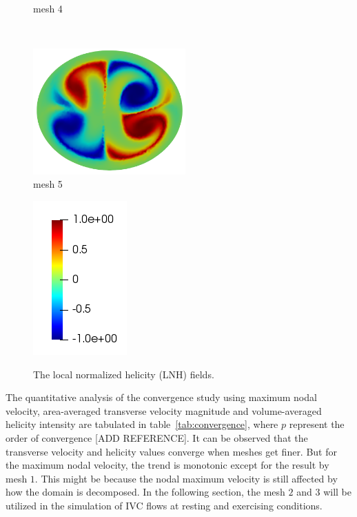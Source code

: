 \begin{figure}[htbp]
\begin{minipage}[c][2in][c]{0.4\linewidth}
        mesh 4
    \end{minipage}\\[.5\baselineskip]
    \begin{minipage}[c][2in][c]{0.4\linewidth}
        \centering
        \includegraphics[width=2.3in]{imgs/vena_cava/LNH_mesh5.png}\\
        mesh 5
    \end{minipage}
    \begin{minipage}[c][2in][c]{0.4\linewidth}
        \centering
        \includegraphics[width=.7in]{imgs/vena_cava/colormap_LNH.png}\\
    \end{minipage}
    \caption{The local normalized helicity (LNH) fields.}
    \label{fig:lnh}
\end{figure}

The quantitative analysis of the convergence study using maximum nodal velocity, area-averaged transverse velocity magnitude and volume-averaged helicity intensity are tabulated in table~\ref{tab:convergence}, where $p$ represent the order of convergence [ADD REFERENCE].
It can be observed that the transverse velocity and helicity values converge when meshes get finer. But for the maximum nodal velocity, the trend is monotonic except for the result by mesh $1$. This might be because the nodal maximum velocity is still affected by how the domain is decomposed. In the following section, the mesh $2$ and $3$ will be utilized in the simulation of IVC flows at resting and exercising conditions.

